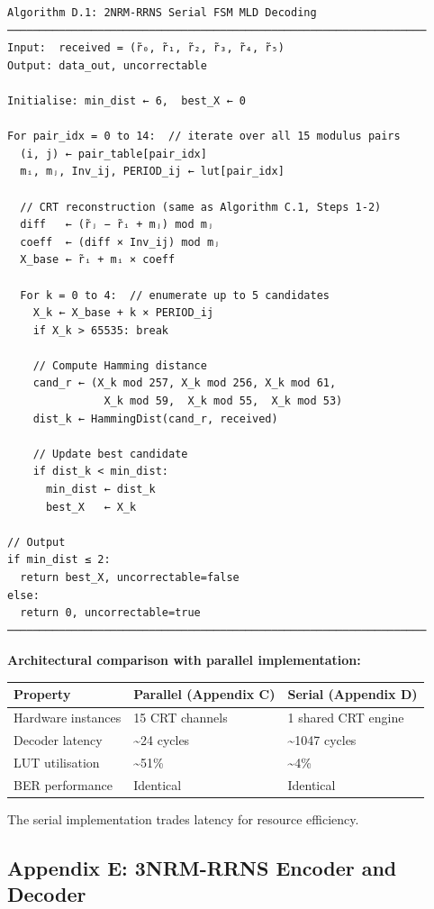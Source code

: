 \begin{verbatim}
Algorithm D.1: 2NRM-RRNS Serial FSM MLD Decoding
─────────────────────────────────────────────────────────────────
Input:  received = (r̃₀, r̃₁, r̃₂, r̃₃, r̃₄, r̃₅)
Output: data_out, uncorrectable

Initialise: min_dist ← 6,  best_X ← 0

For pair_idx = 0 to 14:  // iterate over all 15 modulus pairs
  (i, j) ← pair_table[pair_idx]
  mᵢ, mⱼ, Inv_ij, PERIOD_ij ← lut[pair_idx]

  // CRT reconstruction (same as Algorithm C.1, Steps 1-2)
  diff   ← (r̃ⱼ − r̃ᵢ + mⱼ) mod mⱼ
  coeff  ← (diff × Inv_ij) mod mⱼ
  X_base ← r̃ᵢ + mᵢ × coeff

  For k = 0 to 4:  // enumerate up to 5 candidates
    X_k ← X_base + k × PERIOD_ij
    if X_k > 65535: break

    // Compute Hamming distance
    cand_r ← (X_k mod 257, X_k mod 256, X_k mod 61,
               X_k mod 59,  X_k mod 55,  X_k mod 53)
    dist_k ← HammingDist(cand_r, received)

    // Update best candidate
    if dist_k < min_dist:
      min_dist ← dist_k
      best_X   ← X_k

// Output
if min_dist ≤ 2:
  return best_X, uncorrectable=false
else:
  return 0, uncorrectable=true
─────────────────────────────────────────────────────────────────
\end{verbatim}

\textbf{Architectural comparison with parallel implementation:}

{\def\LTcaptype{none} %
\begin{longtable}[]{@{}lll@{}}
\toprule\noalign{}
Property & Parallel (Appendix C) & Serial (Appendix D) \\
\midrule\noalign{}
\endhead
\bottomrule\noalign{}
\endlastfoot
Hardware instances & 15 CRT channels & 1 shared CRT engine \\
Decoder latency & \textasciitilde24 cycles & \textasciitilde1047
cycles \\
LUT utilisation & \textasciitilde51\% & \textasciitilde4\% \\
BER performance & Identical & Identical \\
\end{longtable}
}

The serial implementation trades latency for resource efficiency.

\subsection{Appendix E: 3NRM-RRNS Encoder and
Decoder}\label{appendix-e-3nrm-rrns-encoder-and-decoder}

